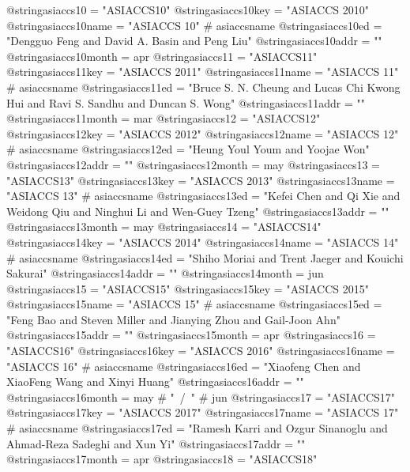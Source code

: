 @string{asiaccs10 =             "ASIACCS10"}
@string{asiaccs10key =          "ASIACCS 2010"}
@string{asiaccs10name =         "ASIACCS 10" # asiaccsname}
@string{asiaccs10ed =           "Dengguo Feng and David A. Basin and Peng Liu"}
@string{asiaccs10addr =         ""}
@string{asiaccs10month =        apr}
@string{asiaccs11 =             "ASIACCS11"}
@string{asiaccs11key =          "ASIACCS 2011"}
@string{asiaccs11name =         "ASIACCS 11" # asiaccsname}
@string{asiaccs11ed =           "Bruce S. N. Cheung and Lucas Chi Kwong Hui and Ravi S. Sandhu and Duncan S. Wong"}
@string{asiaccs11addr =         ""}
@string{asiaccs11month =        mar}
@string{asiaccs12 =             "ASIACCS12"}
@string{asiaccs12key =          "ASIACCS 2012"}
@string{asiaccs12name =         "ASIACCS 12" # asiaccsname}
@string{asiaccs12ed =           "Heung Youl Youm and Yoojae Won"}
@string{asiaccs12addr =         ""}
@string{asiaccs12month =        may}
@string{asiaccs13 =             "ASIACCS13"}
@string{asiaccs13key =          "ASIACCS 2013"}
@string{asiaccs13name =         "ASIACCS 13" # asiaccsname}
@string{asiaccs13ed =           "Kefei Chen and Qi Xie and Weidong Qiu and Ninghui Li and Wen-Guey Tzeng"}
@string{asiaccs13addr =         ""}
@string{asiaccs13month =        may}
@string{asiaccs14 =             "ASIACCS14"}
@string{asiaccs14key =          "ASIACCS 2014"}
@string{asiaccs14name =         "ASIACCS 14" # asiaccsname}
@string{asiaccs14ed =           "Shiho Moriai and Trent Jaeger and Kouichi Sakurai"}
@string{asiaccs14addr =         ""}
@string{asiaccs14month =        jun}
@string{asiaccs15 =             "ASIACCS15"}
@string{asiaccs15key =          "ASIACCS 2015"}
@string{asiaccs15name =         "ASIACCS 15" # asiaccsname}
@string{asiaccs15ed =           "Feng Bao and Steven Miller and Jianying Zhou and Gail-Joon Ahn"}
@string{asiaccs15addr =         ""}
@string{asiaccs15month =        apr}
@string{asiaccs16 =             "ASIACCS16"}
@string{asiaccs16key =          "ASIACCS 2016"}
@string{asiaccs16name =         "ASIACCS 16" # asiaccsname}
@string{asiaccs16ed =           "Xiaofeng Chen and XiaoFeng Wang and Xinyi Huang"}
@string{asiaccs16addr =         ""}
@string{asiaccs16month =        may # "~/~" # jun}
@string{asiaccs17 =             "ASIACCS17"}
@string{asiaccs17key =          "ASIACCS 2017"}
@string{asiaccs17name =         "ASIACCS 17" # asiaccsname}
@string{asiaccs17ed =           "Ramesh Karri and Ozgur Sinanoglu and Ahmad-Reza Sadeghi and Xun Yi"}
@string{asiaccs17addr =         ""}
@string{asiaccs17month =        apr}
@string{asiaccs18 =             "ASIACCS18"}
